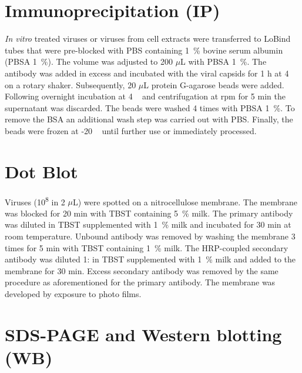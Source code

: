 \section{Immunoprecipitation (IP)}
\textit{In vitro} treated viruses or viruses from cell extracts were transferred to LoBind tubes that were pre-blocked with PBS containing 1~\% bovine serum albumin (PBSA 1~\%). The volume was adjusted to 200 $\mu$L with PBSA 1~\%. The antibody was added in excess and incubated with the viral capsids for 1 h at 4 \textcelsius~ on a rotary shaker. Subsequently, 20 $\mu$L protein G-agarose beads were added. Following overnight incubation at 4 \textcelsius~ and centrifugation at  rpm for 5 min the supernatant was discarded. The beads were washed 4 times with PBSA 1~\%. To remove the BSA an additional wash step was carried out with PBS. Finally, the beads were frozen at -20 \textcelsius~ until further use or immediately processed. 


\section{Dot Blot}
Viruses (10\textsuperscript{8} in 2 $\mu$L) were spotted on a nitrocellulose membrane. The membrane was blocked for 20 min with TBST containing 5~\% milk. The primary antibody was diluted in TBST supplemented with 1~\% milk and incubated for 30 min at room temperature. Unbound antibody was removed by washing the membrane 3 times for 5 min with TBST containing 1~\% milk. The HRP-coupled secondary antibody was diluted 1: in TBST supplemented with 1~\% milk and added to the membrane for 30 min. Excess secondary antibody was removed by the same procedure as aforementioned for the primary antibody. The membrane was developed by exposure to photo films.    


\section{SDS-PAGE and Western blotting (WB)}

